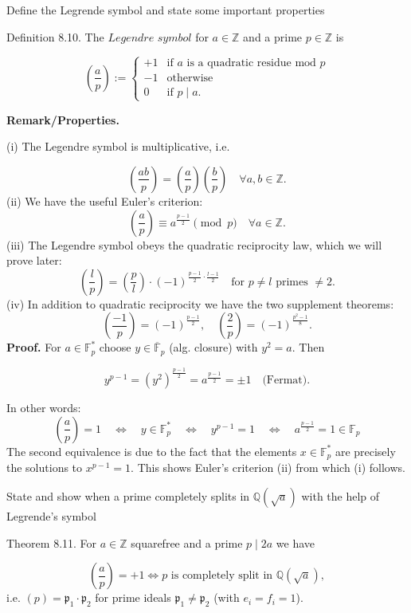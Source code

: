 Define the Legrende symbol and state some important properties

Definition 8.10.
The \( \textit{Legendre symbol} \) for \( a \in \mathbb{Z} \) and a prime \( p \in \mathbb{Z} \) is

\[
\left( \frac{a}{p} \right) := 
\begin{cases} 
+1 & \text{if } a \text{ is a quadratic residue mod } p \\ 
-1 & \text{otherwise} \\
0 & \text{if } p \mid a.
\end{cases}
\]

\textbf{Remark/Properties.} 

(i) The Legendre symbol is multiplicative, i.e.

\[
\left( \frac{ab}{p} \right) = \left( \frac{a}{p} \right) \left( \frac{b}{p} \right) \quad \forall a, b \in \mathbb{Z}.
\]
(ii) We have the useful Euler’s criterion:
\[
\left( \frac{a}{p} \right) \equiv a^{\frac{p-1}{2}} \pmod{p} \quad \forall a \in \mathbb{Z}.
\]
(iii) The Legendre symbol obeys the quadratic reciprocity law, which we will prove later:
\[
\left( \frac{l}{p} \right) = \left( \frac{p}{l} \right) \cdot (-1)^{\frac{p-1}{2} \cdot \frac{l-1}{2}} \quad \text{for } p \neq l \text{ primes } \neq 2.
\]
(iv) In addition to quadratic reciprocity we have the two supplement theorems:
\[
\left( \frac{-1}{p} \right) = (-1)^{\frac{p-1}{2}}, \quad \left( \frac{2}{p} \right) = (-1)^{\frac{p^2-1}{8}}.
\]
\textbf{Proof.} For \( a \in \mathbb{F}_p^* \) choose \( y \in \overline{\mathbb{F}}_p \) (alg. closure) with \( y^2 = a \). Then

\[
y^{p-1} = (y^2)^{\frac{p-1}{2}} = a^{\frac{p-1}{2}} = \pm 1 \quad \text{(Fermat)}.
\]

In other words:
\[
\left( \frac{a}{p} \right) = 1 \quad \iff \quad y \in \mathbb{F}_p^* \quad \iff \quad y^{p-1} = 1 \quad \iff \quad a^{\frac{p-1}{2}} = 1 \in \mathbb{F}_p
\]
The second equivalence is due to the fact that the elements \( x \in \mathbb{F}_p^* \) are precisely the solutions to \( x^{p-1} = 1 \). 
This shows Euler’s criterion (ii) from which (i) follows.


State and show when a prime completely splits in \( \mathbb{Q}(\sqrt{a}) \) with the help of Legrende's symbol

Theorem 8.11. 
For \( a \in \mathbb{Z} \) squarefree and a prime \( p \mid 2a \) we have

\[
\left( \frac{a}{p} \right) = +1 \iff p \text{ is completely split in } \mathbb{Q}(\sqrt{a}),
\]
i.e. \( (p) = \mathfrak{p}_1 \cdot \mathfrak{p}_2 \) for prime ideals \( \mathfrak{p}_1 \neq \mathfrak{p}_2 \) (with \( e_i = f_i = 1 \)).

